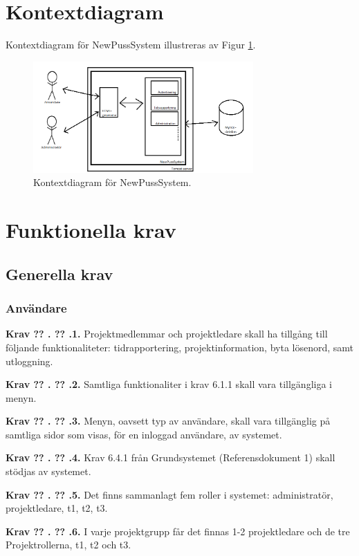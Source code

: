 \documentclass[a4paper]{article}
\newcommand\getcurrentref[1]{%
 \ifnumequal{\value{#1}}{0}
  {??}
  {\the\value{#1}}%
}
\newcommand\requirement[2]{
	\numberedrow{Krav}{#1}{#2}
}
\newcommand\numberedrow[3]{
	\noindent
	\textbf{#1 \getcurrentref{section}.\getcurrentref{subsection}.#2.} #3
	
}
\begin{document}
\section{Kontextdiagram}
Kontextdiagram för NewPussSystem illustreras av Figur \ref{image_kontext}.

\begin{figure}[h!]
  \centering
    \includegraphics[width=0.75\textwidth]{context}
   \caption{Kontextdiagram för NewPussSystem.}
   \label{image_kontext}
\end{figure}


\section{Funktionella krav}
	\subsection{Generella krav}
		\label{krav-funk-gen}
		\subsubsection*{Användare}
		\requirement{1}{Projektmedlemmar och projektledare skall ha tillgång till följande funktionaliteter: tidrapportering, projektinformation, byta lösenord, samt utloggning.}
		
		\requirement{2}{Samtliga funktionaliter i krav 6.1.1 skall vara tillgängliga i menyn.}
		\requirement{3}{Menyn, oavsett typ av användare, skall vara tillgänglig på samtliga sidor som visas, för en inloggad användare, av systemet.}
		\requirement{4}{Krav 6.4.1 från Grundsystemet (Referensdokument 1) skall stödjas av systemet.}
		\requirement{5}{Det finns sammanlagt fem roller i systemet: administratör, projektledare, t1, t2, t3.}
		\requirement{6}{I varje projektgrupp får det finnas 1-2 projektledare och de tre Projektrollerna, t1, t2 och t3.}
\end{document}
